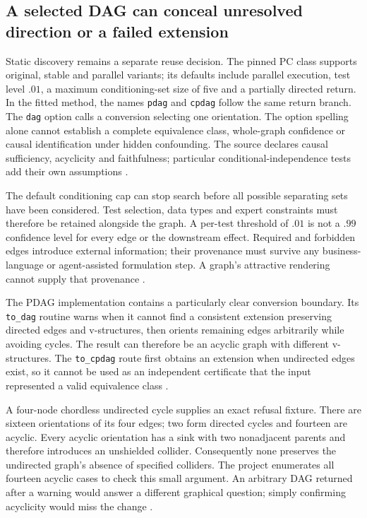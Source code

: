\subsection{A selected DAG can conceal unresolved direction or a failed extension}

Static discovery remains a separate reuse decision. The pinned PC class
supports original, stable and parallel variants; its defaults include
parallel execution, test level $.01$, a maximum conditioning-set size of
five and a partially directed return. In the fitted method, the names
\texttt{pdag} and \texttt{cpdag} follow the same return branch.
The \texttt{dag} option calls a conversion selecting one orientation.
The option spelling alone cannot establish a complete equivalence class,
whole-graph confidence or causal identification under hidden confounding.
The source declares causal sufficiency, acyclicity and faithfulness;
particular conditional-independence tests add their own assumptions
\cite{exec13_pgmpy_reuse_primary}.

The default conditioning cap can stop search before all possible separating
sets have been considered. Test selection, data types and expert constraints
must therefore be retained alongside the graph. A per-test threshold of
$.01$ is not a $.99$ confidence level for every edge or the downstream
effect. Required and forbidden edges introduce external information;
their provenance must survive any business-language or agent-assisted
formulation step. A graph's attractive rendering cannot supply that
provenance \cite{exec13_pgmpy_reuse_primary}.

The PDAG implementation contains a particularly clear conversion boundary.
Its \texttt{to\_dag} routine warns when it cannot find a consistent
extension preserving directed edges and v-structures, then orients remaining
edges arbitrarily while avoiding cycles. The result can therefore be an
acyclic graph with different v-structures. The \texttt{to\_cpdag} route
first obtains an extension when undirected edges exist, so it cannot be
used as an independent certificate that the input represented a valid
equivalence class \cite{exec13_pgmpy_reuse_primary}.

A four-node chordless undirected cycle supplies an exact refusal fixture.
There are sixteen orientations of its four edges; two form directed cycles
and fourteen are acyclic. Every acyclic orientation has a sink with two
nonadjacent parents and therefore introduces an unshielded collider.
Consequently none preserves the undirected graph's absence of specified
colliders. The project enumerates all fourteen acyclic cases to check this
small argument. An arbitrary DAG returned after a warning would answer a
different graphical question; simply confirming acyclicity would miss the
change \cite{exec13_pgmpy_reuse_oracle}.

